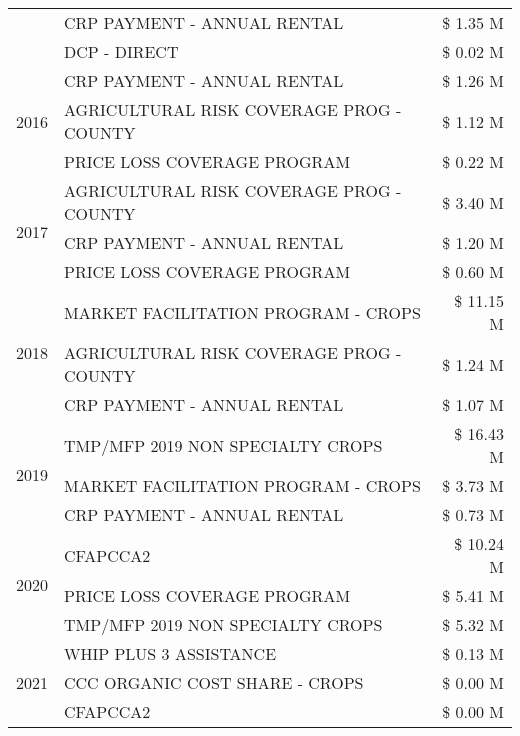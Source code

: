 \begin{tabular}{llr}
 & CRP PAYMENT - ANNUAL RENTAL & \$ 1.35 M \\
 & DCP - DIRECT & \$ 0.02 M \\
\cline{1-3}
\multirow[t]{3}{*}{2016} & CRP PAYMENT - ANNUAL RENTAL & \$ 1.26 M \\
 & AGRICULTURAL RISK COVERAGE PROG - COUNTY & \$ 1.12 M \\
 & PRICE LOSS COVERAGE PROGRAM & \$ 0.22 M \\
\cline{1-3}
\multirow[t]{3}{*}{2017} & AGRICULTURAL RISK COVERAGE PROG - COUNTY & \$ 3.40 M \\
 & CRP PAYMENT - ANNUAL RENTAL & \$ 1.20 M \\
 & PRICE LOSS COVERAGE PROGRAM & \$ 0.60 M \\
\cline{1-3}
\multirow[t]{3}{*}{2018} & MARKET FACILITATION PROGRAM - CROPS & \$ 11.15 M \\
 & AGRICULTURAL RISK COVERAGE PROG - COUNTY & \$ 1.24 M \\
 & CRP PAYMENT - ANNUAL RENTAL & \$ 1.07 M \\
\cline{1-3}
\multirow[t]{3}{*}{2019} & TMP/MFP 2019 NON SPECIALTY CROPS & \$ 16.43 M \\
 & MARKET FACILITATION PROGRAM - CROPS & \$ 3.73 M \\
 & CRP PAYMENT - ANNUAL RENTAL & \$ 0.73 M \\
\cline{1-3}
\multirow[t]{3}{*}{2020} & CFAPCCA2 & \$ 10.24 M \\
 & PRICE LOSS COVERAGE PROGRAM & \$ 5.41 M \\
 & TMP/MFP 2019 NON SPECIALTY CROPS & \$ 5.32 M \\
\cline{1-3}
\multirow[t]{3}{*}{2021} & WHIP PLUS 3 ASSISTANCE & \$ 0.13 M \\
 & CCC ORGANIC COST SHARE - CROPS & \$ 0.00 M \\
 & CFAPCCA2 & \$ 0.00 M \\
\cline{1-3}
\bottomrule
\end{tabular}
